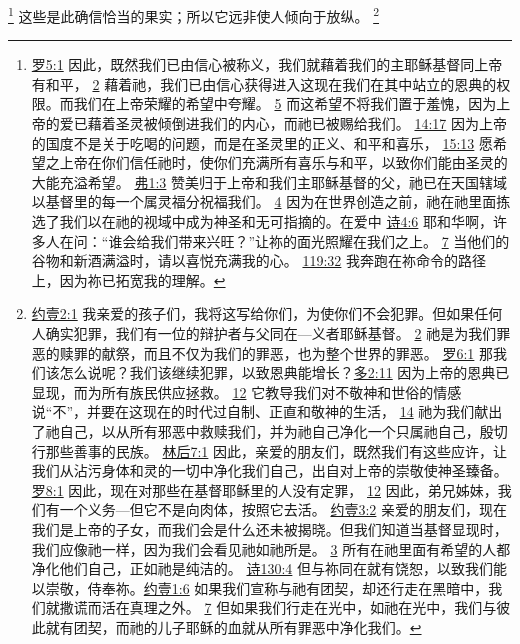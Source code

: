\documentclass[12pt, a4paper, oneside]{ctexart}
\begin{document}
	\footnote {
		\href{https://biblehub.com/romans/5-1.htm}{罗5:1} 因此，既然我们已由信心被称义，我们就藉着我们的主耶稣基督同上帝有和平，
		\href{https://biblehub.com/romans/5-2.htm}{2} 藉着祂，我们已由信心获得进入这现在我们在其中站立的恩典的权限。而我们在上帝荣耀的希望中夸耀。
		\href{https://biblehub.com/romans/5-5.htm}{5} 而这希望不将我们置于羞愧，因为上帝的爱已藉着圣灵被倾倒进我们的内心，而祂已被赐给我们。
		\href{https://biblehub.com/romans/14-17.htm}{14:17} 因为上帝的国度不是关于吃喝的问题，而是在圣灵里的正义、和平和喜乐，
		\href{https://biblehub.com/romans/15-13.htm}{15:13} 愿希望之上帝在你们信任祂时，使你们充满所有喜乐与和平，以致你们能由圣灵的大能充溢希望。
		\href{https://biblehub.com/ephesians/1-3.htm}{弗1:3} 赞美归于上帝和我们主耶稣基督的父，祂已在天国辖域以基督里的每一个属灵福分祝福我们。
		\href{https://biblehub.com/ephesians/1-4.htm}{4} 因为在世界创造之前，祂在祂里面拣选了我们以在祂的视域中成为神圣和无可指摘的。在爱中
		\href{https://biblehub.com/psalms/4-6.htm}{诗4:6} 耶和华啊，许多人在问：“谁会给我们带来兴旺？”让祢的面光照耀在我们之上。
		\href{https://biblehub.com/psalms/4-7.htm}{7} 当他们的谷物和新酒满溢时，请以喜悦充满我的心。
		\href{https://biblehub.com/psalms/119-32.htm}{119:32} 我奔跑在祢命令的路径上，因为祢已拓宽我的理解。
	}
	这些是此确信恰当的果实；所以它远非使人倾向于放纵。
	\footnote {
		\href{https://biblehub.com/1_john/2-1.htm}{约壹2:1} 我亲爱的孩子们，我将这写给你们，为使你们不会犯罪。但如果任何人确实犯罪，我们有一位的辩护者与父同在---义者耶稣基督。
		\href{https://biblehub.com/1_john/2-2.htm}{2} 祂是为我们罪恶的赎罪的献祭，而且不仅为我们的罪恶，也为整个世界的罪恶。
		\href{https://biblehub.com/romans/6-1.htm}{罗6:1} 那我们该怎么说呢？我们该继续犯罪，以致恩典能增长？\href{https://biblehub.com/titus/2-11.htm}{多2:11} 因为上帝的恩典已显现，而为所有族民供应拯救。
		\href{https://biblehub.com/titus/2-12.htm}{12} 它教导我们对不敬神和世俗的情感说“不”，并要在这现在的时代过自制、正直和敬神的生活，
		\href{https://biblehub.com/titus/2-14.htm}{14} 祂为我们献出了祂自己，以从所有邪恶中救赎我们，并为祂自己净化一个只属祂自己，殷切行那些善事的民族。
		\href{https://biblehub.com/2_corinthians/7-1.htm}{林后7:1} 因此，亲爱的朋友们，既然我们有这些应许，让我们从沾污身体和灵的一切中净化我们自己，出自对上帝的崇敬使神圣臻备。
		\href{https://biblehub.com/romans/8-1.htm}{罗8:1} 因此，现在对那些在基督耶稣里的人没有定罪，
		\href{https://biblehub.com/romans/8-12.htm}{12} 因此，弟兄姊妹，我们有一个义务---但它不是向肉体，按照它去活。
		\href{https://biblehub.com/1_john/3-2.htm}{约壹3:2} 亲爱的朋友们，现在我们是上帝的子女，而我们会是什么还未被揭晓。但我们知道当基督显现时，我们应像祂一样，因为我们会看见祂如祂所是。
		\href{https://biblehub.com/1_john/3-3.htm}{3} 所有在祂里面有希望的人都净化他们自己，正如祂是纯洁的。
		\href{https://biblehub.com/psalms/130-4.htm}{诗130:4} 但与祢同在就有饶恕，以致我们能以崇敬，侍奉祢。\href{https://biblehub.com/1_john/1-6.htm}{约壹1:6} 如果我们宣称与祂有团契，却还行走在黑暗中，我们就撒谎而活在真理之外。
		\href{https://biblehub.com/1_john/1-7.htm}{7} 但如果我们行走在光中，如祂在光中，我们与彼此就有团契，而祂的儿子耶稣的血就从所有罪恶中净化我们。
	}
\end{document}
